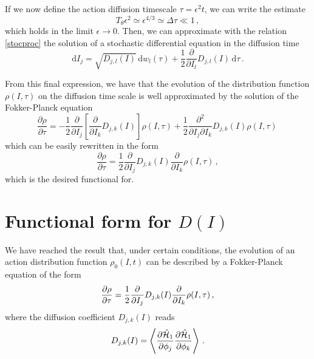 If we now define the action diffusion timescale $\tau=\epsilon^2 t$, we can write the estimate 
\begin{equation}
    T_\theta \epsilon^2\simeq \epsilon^{4/3}\simeq \Delta \tau\ll 1 \,,
\end{equation}
which holds in the limit $\epsilon\to 0$. Then, we can approximate with the relation \eqref{stocproc} the solution of a stochastic differential equation in the diffusion time
\begin{equation}
    \mathrm{d}I_j=\sqrt{D_{j,l}(I)}\,\mathrm{d}w_l(\tau)+
    \frac{1}{2} \frac{\partial}{\partial I_l}D_{j,l}(I) \,\mathrm{d}\tau \,.
    \label{stocaction}
\end{equation}

From this final expression, we have that the evolution of the distribution function $\rho(I,\tau)$ on the diffusion time scale is well approximated by the solution of the Fokker-Planck equation
\begin{equation}
    \frac{\partial \rho}{\partial \tau}=- \frac{1}{2} \frac{\partial }{\partial I_j}
    \left [\frac{\partial}{\partial I_k}D_{j,k}(I) \right ]\rho(I,\tau)
    +\frac{1}{2}\frac{\partial^2}{\partial I_j\partial I_k}D_{j,k}(I)\rho(I,\tau)\,
\end{equation}
which can be easily rewritten in the form
\begin{equation}
    \frac{\partial \rho}{\partial \tau}=
    \frac{1}{2}\frac{\partial}{\partial I_j}D_{j,k}(I)
    \frac{\partial}{\partial I_k}\rho(I,\tau) \,,
    \label{fokker1}
\end{equation}
which is the desired functional for.

\section{Functional form for $D(I)$}\label{sec:diff:functional_form}

We have reached the result that, under certain conditions, the evolution of an action distribution function $\rho_0(I, t)$ can be described by a Fokker-Planck equation of the form
\begin{equation}
    \pdv{\rho}{\tau}=\frac{1}{2}\pdv{}{I_j} D_{j,k}(I) \pdv{}{I_k}\rho(I,\tau)\,,
    \label{eq:final-fp}
\end{equation} 
where the diffusion coefficient $D_{j,k}(I)$ reads
\begin{equation}
    D_{j,k}(I) = \left\langle\pdv{\hat{\mathcal{H}}_1}{\phi_j}\pdv{\hat{\mathcal{H}}_1}{\phi_k}\right\rangle \,.
\end{equation}

